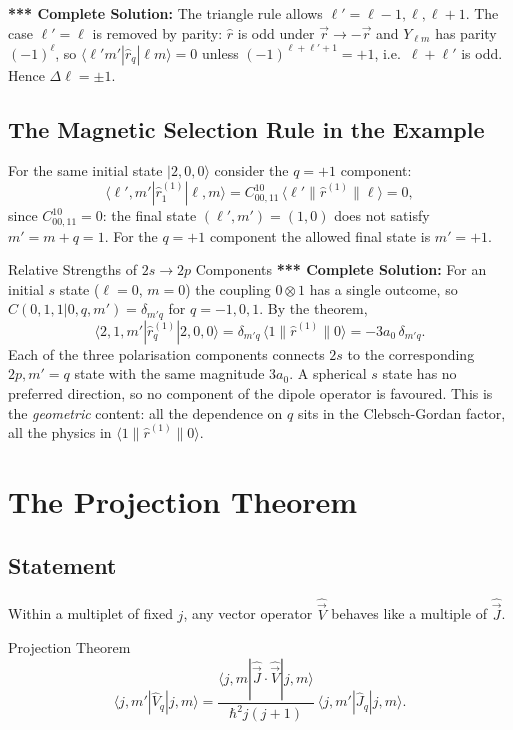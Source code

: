 \documentclass[11pt,a4paper]{article}
\begin{document}
\textbf{*** Complete Solution:} The triangle rule allows $\ell'=\ell-1,\ell,\ell+1$. The case $\ell'=\ell$ is removed by parity: $\hat r$ is odd under $\vec r\to-\vec r$ and $Y_{\ell m}$ has parity $(-1)^\ell$, so $\langle\ell'm'|\hat r_q|\ell m\rangle=0$ unless $(-1)^{\ell+\ell'+1}=+1$, i.e.\ $\ell+\ell'$ is odd. Hence $\Delta\ell=\pm1$.

\subsection{The Magnetic Selection Rule in the Example}
For the same initial state $|2,0,0\rangle$ consider the $q=+1$ component:
\[
\langle\ell',m'|\hat r^{(1)}_{1}|\ell,m\rangle=C^{10}_{00,11}\,\langle\ell'\|\hat r^{(1)}\|\ell\rangle=0,
\]
since $C^{10}_{00,11}=0$: the final state $(\ell',m')=(1,0)$ does not satisfy $m'=m+q=1$. For the $q=+1$ component the allowed final state is $m'=+1$.

\begin{prob}{Relative Strengths of $2s\to2p$ Components}
\textbf{*** Complete Solution:} For an initial $s$ state ($\ell=0$, $m=0$) the coupling $0\otimes1$ has a single outcome, so $C(0,1,1|0,q,m')=\delta_{m'q}$ for $q=-1,0,1$. By the theorem,
\[
\langle2,1,m'|\hat r^{(1)}_q|2,0,0\rangle=\delta_{m'q}\,\langle1\|\hat r^{(1)}\|0\rangle=-3a_0\,\delta_{m'q}.
\]
Each of the three polarisation components connects $2s$ to the corresponding $2p,m'=q$ state with the same magnitude $3a_0$. A spherical $s$ state has no preferred direction, so no component of the dipole operator is favoured. This is the \emph{geometric} content: all the dependence on $q$ sits in the Clebsch-Gordan factor, all the physics in $\langle1\|\hat r^{(1)}\|0\rangle$.
\end{prob}

\section{The Projection Theorem}
\label{to:sec:proj}

\subsection{Statement}
Within a multiplet of fixed $j$, any vector operator $\hat{\vec V}$ behaves like a multiple of $\hat{\vec J}$.

\begin{thm}{Projection Theorem}
\[
\langle j,m'|\hat V_q|j,m\rangle=\frac{\langle j,m|\hat{\vec J}\cdot\hat{\vec V}|j,m\rangle}{\hbar^2j(j+1)}\ \langle j,m'|\hat J_q|j,m\rangle .
\]
\end{thm}
\end{document}
